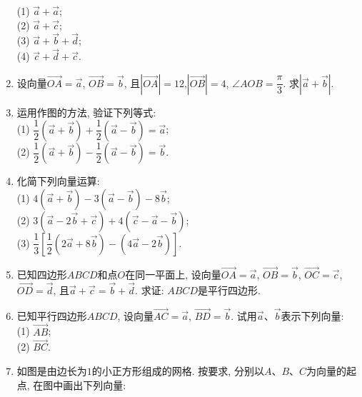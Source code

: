 \documentclass[10pt,a4paper]{article}
\begin{document}
\begin{enumerate}[1.]
(1) $\overrightarrow a+\overrightarrow a$;\\
(2) $\overrightarrow a+\overrightarrow c$;\\
(3) $\overrightarrow a+\overrightarrow b+\overrightarrow d$;\\
(4) $\overrightarrow c+\overrightarrow d+\overrightarrow c$.
\item 设向量$\overrightarrow{OA}=\overrightarrow a$, $\overrightarrow{OB}=\overrightarrow b$, 且$|\overrightarrow{OA}|=12$,$|\overrightarrow{OB}|=4$, $\angle AOB=\dfrac \pi 3$. 求$|\overrightarrow a+\overrightarrow b|$.
\item 运用作图的方法, 验证下列等式:\\
(1) $\dfrac 12(\overrightarrow a+\overrightarrow b)+\dfrac 12(\overrightarrow a-\overrightarrow b)=\overrightarrow a$;\\
(2) $\dfrac 12(\overrightarrow a+\overrightarrow b)-\dfrac 12(\overrightarrow a-\overrightarrow b)=\overrightarrow b$.
\item 化简下列向量运算:\\
(1) $4(\overrightarrow a+\overrightarrow b)-3(\overrightarrow a-\overrightarrow b)-8\overrightarrow b$;\\
(2) $3(\overrightarrow a-2\overrightarrow b+\overrightarrow c)+4(\overrightarrow c-\overrightarrow a-\overrightarrow b)$;\\
(3) $\dfrac 13[\dfrac 12(2\overrightarrow a+8\overrightarrow b)-(4\overrightarrow a-2\overrightarrow b)]$.
\item 已知四边形$ABCD$和点$O$在同一平面上, 设向量$\overrightarrow{OA}=\overrightarrow a$, $\overrightarrow{OB}=\overrightarrow b$, $\overrightarrow{OC}=\overrightarrow c$, $\overrightarrow{OD}=\overrightarrow d$, 且$\overrightarrow a+\overrightarrow c=\overrightarrow b+\overrightarrow d$. 求证: $ABCD$是平行四边形.
\item 已知平行四边形$ABCD$, 设向量$\overrightarrow{AC}=\overrightarrow a$, $\overrightarrow{BD}=\overrightarrow b$. 试用$\overrightarrow a$、$\overrightarrow b$表示下列向量:\\
(1) $\overrightarrow{AB}$;\\
(2) $\overrightarrow{BC}$.
\item 如图是由边长为$1$的小正方形组成的网格. 按要求, 分别以$A$、$B$、$C$为向量的起点, 在图中画出下列向量:
\begin{center}
\end{center}
\end{enumerate}
\end{document}
